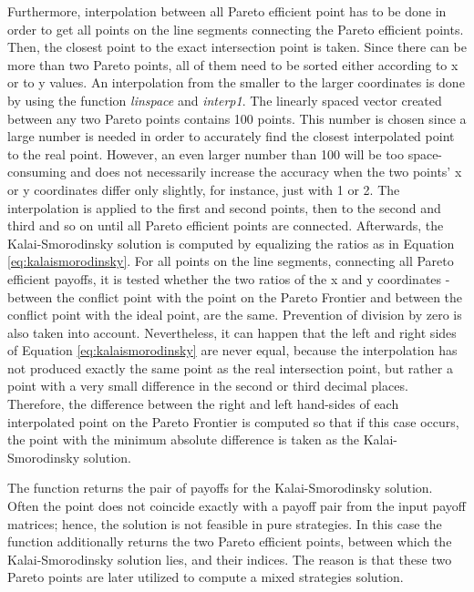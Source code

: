 Furthermore, interpolation between all Pareto efficient point has to be done in order to get all points on the line segments connecting the Pareto efficient points. Then, the closest point to the exact intersection point is taken. Since there can be more than two Pareto points, all of them need to be sorted either according to x or to y values. An interpolation from the smaller to the larger coordinates is done by using the function \textit{linspace} and \textit{interp1}. The linearly spaced vector created between any two Pareto points contains 100 points. This number is chosen since a large number is needed in order to accurately find the closest interpolated point to the real point. However, an even larger number than 100 will be too space-consuming and does not necessarily increase the accuracy when the two points' x or y coordinates differ only slightly, for instance, just with 1 or 2. The interpolation is applied to the first and second points, then to the second and third and so on until all Pareto efficient points are connected. Afterwards, the Kalai-Smorodinsky solution is computed by equalizing the ratios as in Equation \ref{eq:kalaismorodinsky}. For all points on the line segments, connecting all Pareto efficient payoffs, it is tested whether the two ratios of the x and y coordinates - between the conflict point with the point on the Pareto Frontier and between the conflict point with the ideal point, are the same. Prevention of division by zero is also taken into account. Nevertheless, it can happen that the left and right sides of Equation \ref{eq:kalaismorodinsky} are never equal, because the interpolation has not produced exactly the same point as the real intersection point, but rather a point with a very small difference in the second or third decimal places. Therefore, the difference between the right and left hand-sides of each interpolated point on the Pareto Frontier is computed so that if this case occurs, the point with the minimum absolute difference is taken as the Kalai-Smorodinsky solution.

The function returns the pair of payoffs for the Kalai-Smorodinsky solution. Often the point does not coincide exactly with a payoff pair from the input payoff matrices; hence, the solution is not feasible in pure strategies. In this case the function additionally returns the two Pareto efficient points, between which the Kalai-Smorodinsky solution lies, and their indices. The reason is that these two Pareto points are later utilized to compute a mixed strategies solution.

